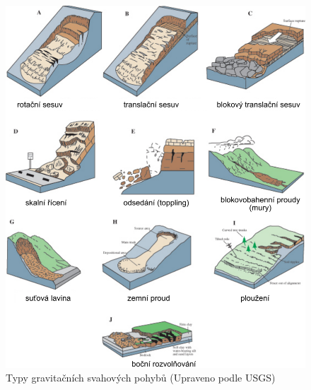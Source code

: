 \begin{figure}
	\centering
	\includegraphics[width=1\linewidth]{obrazky/slope/landslide_type}
	\caption{Typy gravitačních svahových pohybů (Upraveno podle USGS)}
	\label{fig:landslidetype}
\end{figure}


